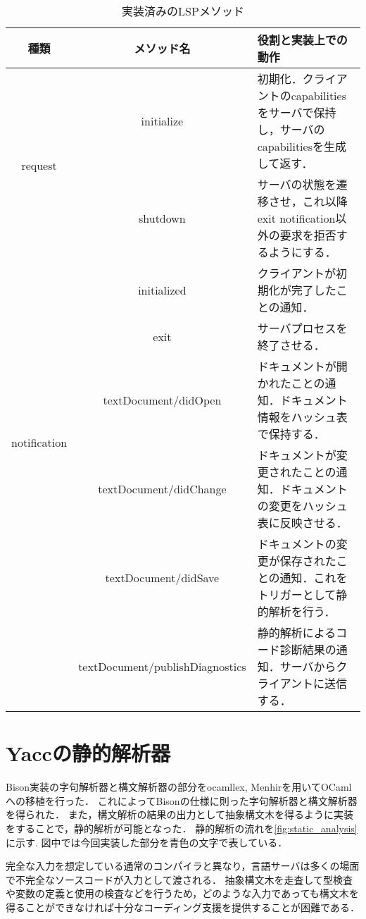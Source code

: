 \documentclass[fontsize=9bp,twocolumn,column_gap=2.36zw,a4paper,report]{jlreq}
\begin{document}
\begin{table*}[h]
	\caption{実装済みのLSPメソッド}\label{tbl:lsp_method}
	\small
	\centering
	\begin{tabularx}{\linewidth}{|c|c|X|}
		\hline
		種類 & メソッド名& 役割と実装上での動作 \\
		\hline\hline
		\multirow{2}{*}{request} & initialize & 初期化．クライアントのcapabilitiesをサーバで保持し，サーバのcapabilitiesを生成して返す． \\
		& shutdown & サーバの状態を遷移させ，これ以降exit notification以外の要求を拒否するようにする． \\
		\hline
		\multirow{5}{*}{notification} & initialized & クライアントが初期化が完了したことの通知． \\
		& exit & サーバプロセスを終了させる． \\
		& textDocument/didOpen & ドキュメントが開かれたことの通知．ドキュメント情報をハッシュ表で保持する． \\
		& textDocument/didChange & ドキュメントが変更されたことの通知．ドキュメントの変更をハッシュ表に反映させる． \\
		& textDocument/didSave & ドキュメントの変更が保存されたことの通知．これをトリガーとして静的解析を行う． \\
		& textDocument/publishDiagnostics & 静的解析によるコード診断結果の通知．サーバからクライアントに送信する． \\
		\hline
	\end{tabularx}
\end{table*}

\section{Yaccの静的解析器}\label{sec:analyzer}

Bison実装の字句解析器と構文解析器の部分をocamllex, Menhirを用いてOCamlへの移植を行った．
これによってBisonの仕様に則った字句解析器と構文解析器を得られた．
また，構文解析の結果の出力として抽象構文木を得るように実装をすることで，静的解析が可能となった．
静的解析の流れを\ref{fig:static_analysis}に示す.
図中では今回実装した部分を青色の文字で表している．\par
完全な入力を想定している通常のコンパイラと異なり，言語サーバは多くの場面で不完全なソースコードが入力として渡される．
抽象構文木を走査して型検査や変数の定義と使用の検査などを行うため，どのような入力であっても構文木を得ることができなければ十分なコーディング支援を提供することが困難である．

\begin{figure}[h]
\end{figure}
\end{document}
